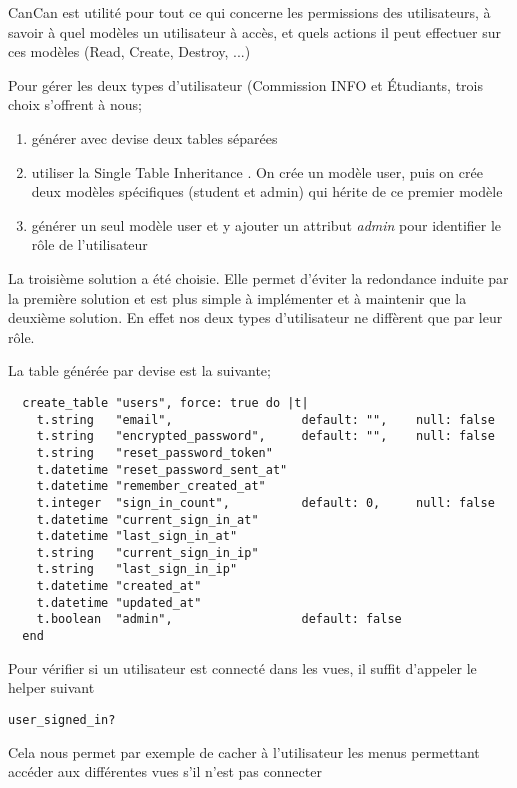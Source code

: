CanCan est utilité pour tout ce qui concerne les permissions des utilisateurs, à savoir à quel modèles un utilisateur à accès, et quels actions il peut effectuer sur ces modèles (Read, Create, Destroy, ...) 

Pour gérer les deux types d'utilisateur (Commission INFO et Étudiants, trois choix s'offrent à nous;
\begin{enumerate}
  \item générer avec devise deux tables séparées
  \item utiliser la Single Table Inheritance \cite{STI}. On crée un modèle user, puis on crée deux modèles spécifiques (student et admin) qui hérite de ce premier modèle
  \item générer un seul modèle user et y ajouter un attribut \textit{admin} pour identifier le rôle de l'utilisateur
\end{enumerate}

La troisième solution a été choisie. Elle permet d'éviter la redondance induite par la première solution et est plus simple à implémenter et à maintenir que la deuxième solution. En effet nos deux types d'utilisateur ne diffèrent que par leur rôle. 


La table générée par devise est la suivante;

\begin{lstlisting}
  create_table "users", force: true do |t|
    t.string   "email",                  default: "",    null: false
    t.string   "encrypted_password",     default: "",    null: false
    t.string   "reset_password_token"
    t.datetime "reset_password_sent_at"
    t.datetime "remember_created_at"
    t.integer  "sign_in_count",          default: 0,     null: false
    t.datetime "current_sign_in_at"
    t.datetime "last_sign_in_at"
    t.string   "current_sign_in_ip"
    t.string   "last_sign_in_ip"
    t.datetime "created_at"
    t.datetime "updated_at"
    t.boolean  "admin",                  default: false
  end
\end{lstlisting}

Pour vérifier si un utilisateur est connecté dans les vues, il suffit d'appeler le helper suivant

\begin{lstlisting}
user_signed_in?
\end{lstlisting}

Cela nous permet par exemple de cacher à l'utilisateur les menus permettant accéder aux différentes vues s'il n'est pas connecter

